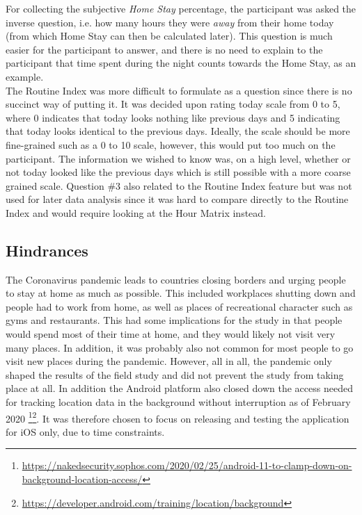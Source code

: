 For collecting the subjective \textit{Home Stay} percentage, the participant was asked the inverse question, i.e. how many hours they were \textit{away} from their home today (from which Home Stay can then be calculated later). This question is much easier for the participant to answer, and there is no need to explain to the participant that time spent during the night counts towards the Home Stay, as an example. \\

The Routine Index was more difficult to formulate as a question since there is no succinct way of putting it. It was decided upon rating today scale from 0 to 5, where 0 indicates that today looks nothing like previous days and 5 indicating that today looks identical to the previous days. Ideally, the scale should be more fine-grained such as a 0 to 10 scale, however, this would put too much on the participant. The information we wished to know was, on a high level, whether or not today looked like the previous days which is still possible with a more coarse grained scale. Question \#3 also related to the Routine Index feature but was not used for later data analysis since it was hard to compare directly to the Routine Index and would require looking at the Hour Matrix instead.

\subsection{Hindrances}
The Coronavirus pandemic leads to countries closing borders and urging people to stay at home as much as possible. This included workplaces shutting down and people had to work from home, as well as places of recreational character such as gyms and restaurants. This had some implications for the study in that people would spend most of their time at home, and they would likely not visit very many places. In addition, it was probably also not common for most people to go visit new places during the pandemic. However, all in all, the pandemic only shaped the results of the field study and did not prevent the study from taking place at all. In addition the Android platform also closed down the access needed for tracking location data in the background without interruption as of February 2020 \footnote{\url{https://nakedsecurity.sophos.com/2020/02/25/android-11-to-clamp-down-on-background-location-access/}}\footnote{\url{https://developer.android.com/training/location/background}}. It was therefore chosen to focus on releasing and testing the application for iOS only, due to time constraints.


